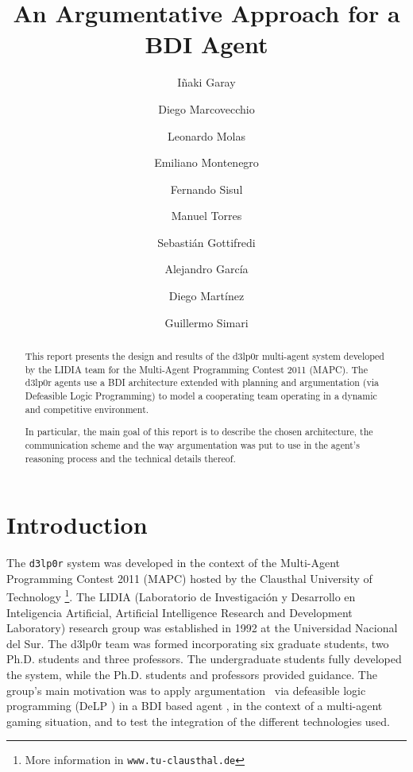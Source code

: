 \documentclass{llncs2e/llncs}
\title{An Argumentative Approach for a BDI Agent}
\author{I\~{n}aki Garay \and      %
        Diego Marcovecchio \and   %
        Leonardo Molas \and       %
        Emiliano Montenegro \and  %
        Fernando Sisul \and       %
        Manuel Torres \and        %
        Sebastián Gottifredi \and %
        Alejandro García \and     %
        Diego Martínez \and       %
        Guillermo Simari          %
        }
\institute{Universidad Nacional del Sur \\\email{\{igarai,diegomarcov,leos.molas,%
emm.montenegro,fsisul,jmtorresluc\}@gmail.com,\\\{sg,ajg,dcm,grs\}%
@cs.uns.edu.ar}}
\begin{document}
\maketitle

\begin{abstract}
    This report presents the design and results of the d3lp0r multi-agent system 
    developed by the LIDIA team for the Multi-Agent Programming Contest 2011 (MAPC).
    The d3lp0r agents use a BDI architecture extended with planning and 
    argumentation (via Defeasible Logic Programming) to model a cooperating team 
    operating in a dynamic and competitive environment.

    In particular, the main goal of this report is to describe the chosen 
    architecture, the communication scheme and the way argumentation was put to 
    use in the agent's reasoning process and the technical details thereof.
\end{abstract}

\section{Introduction}

    The \texttt{d3lp0r} system was developed in the context of the Multi-Agent
    Programming Contest 2011 (MAPC) \cite{BehrensAMAI2010b} hosted by the
    Clausthal University of Technology \footnote{More information in
    \texttt{www.tu-clausthal.de}}.  The LIDIA (Laboratorio de Investigación
    y Desarrollo en Inteligencia Artificial, Artificial Intelligence Research
    and Development Laboratory) research group was established in 1992 at the
    Universidad Nacional del Sur.  The d3lp0r team was formed incorporating six
    graduate students, two Ph.D.  students and three professors. The
    undergraduate students fully developed the system, while the Ph.D. students
    and professors provided guidance. The group's main motivation was to apply
    argumentation \cite{Prakken:1997} \cite{Rahwan:2009}
    \cite{Bench-Capon:2007}\ via defeasible logic programming (DeLP
    \cite{Garcia:2004a}) in a BDI based agent \cite{Amgoud:2008}, in the context
    of a multi-agent gaming situation, and to test the integration of the
    different technologies used.

%
\end{document}
